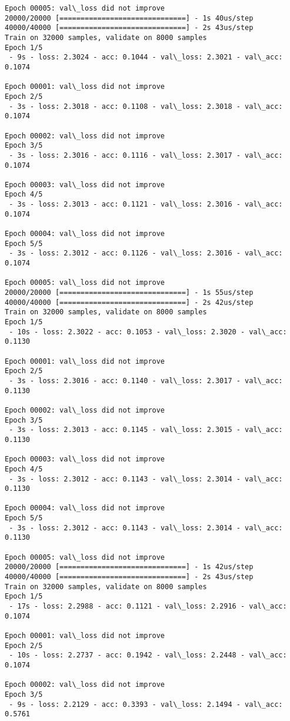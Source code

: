 \documentclass[11pt]{article}
\begin{document}
\begin{Verbatim}[commandchars=\\\{\}]
Epoch 00005: val\_loss did not improve
20000/20000 [==============================] - 1s 40us/step
40000/40000 [==============================] - 2s 43us/step
Train on 32000 samples, validate on 8000 samples
Epoch 1/5
 - 9s - loss: 2.3024 - acc: 0.1044 - val\_loss: 2.3021 - val\_acc: 0.1074

Epoch 00001: val\_loss did not improve
Epoch 2/5
 - 3s - loss: 2.3018 - acc: 0.1108 - val\_loss: 2.3018 - val\_acc: 0.1074

Epoch 00002: val\_loss did not improve
Epoch 3/5
 - 3s - loss: 2.3016 - acc: 0.1116 - val\_loss: 2.3017 - val\_acc: 0.1074

Epoch 00003: val\_loss did not improve
Epoch 4/5
 - 3s - loss: 2.3013 - acc: 0.1121 - val\_loss: 2.3016 - val\_acc: 0.1074

Epoch 00004: val\_loss did not improve
Epoch 5/5
 - 3s - loss: 2.3012 - acc: 0.1126 - val\_loss: 2.3016 - val\_acc: 0.1074

Epoch 00005: val\_loss did not improve
20000/20000 [==============================] - 1s 55us/step
40000/40000 [==============================] - 2s 42us/step
Train on 32000 samples, validate on 8000 samples
Epoch 1/5
 - 10s - loss: 2.3022 - acc: 0.1053 - val\_loss: 2.3020 - val\_acc: 0.1130

Epoch 00001: val\_loss did not improve
Epoch 2/5
 - 3s - loss: 2.3016 - acc: 0.1140 - val\_loss: 2.3017 - val\_acc: 0.1130

Epoch 00002: val\_loss did not improve
Epoch 3/5
 - 3s - loss: 2.3013 - acc: 0.1145 - val\_loss: 2.3015 - val\_acc: 0.1130

Epoch 00003: val\_loss did not improve
Epoch 4/5
 - 3s - loss: 2.3012 - acc: 0.1143 - val\_loss: 2.3014 - val\_acc: 0.1130

Epoch 00004: val\_loss did not improve
Epoch 5/5
 - 3s - loss: 2.3012 - acc: 0.1143 - val\_loss: 2.3014 - val\_acc: 0.1130

Epoch 00005: val\_loss did not improve
20000/20000 [==============================] - 1s 42us/step
40000/40000 [==============================] - 2s 43us/step
Train on 32000 samples, validate on 8000 samples
Epoch 1/5
 - 17s - loss: 2.2988 - acc: 0.1121 - val\_loss: 2.2916 - val\_acc: 0.1074

Epoch 00001: val\_loss did not improve
Epoch 2/5
 - 10s - loss: 2.2737 - acc: 0.1942 - val\_loss: 2.2448 - val\_acc: 0.1074

Epoch 00002: val\_loss did not improve
Epoch 3/5
 - 9s - loss: 2.2129 - acc: 0.3393 - val\_loss: 2.1494 - val\_acc: 0.5761


\end{Verbatim}
\end{document}
